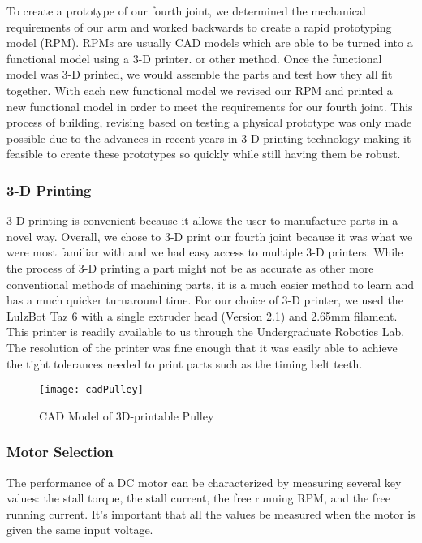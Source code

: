 \noindent To create a prototype of our fourth joint, we determined the mechanical requirements of our arm and worked backwards to create a rapid prototyping model (RPM).  RPMs are usually CAD models which are able to be turned into a functional model using a 3-D printer. or other method.  Once the functional model was 3-D printed, we would assemble the parts and test how they all fit together.  With each new functional model we revised our RPM and printed a new functional model in order to meet the requirements for our fourth joint. This process of building, revising based on testing a physical prototype was only made possible due to the advances in recent years in 3-D printing technology making it feasible to create these prototypes so quickly while still having them be robust. 


\subsubsection{3-D Printing}
3-D printing is convenient because it allows the user to manufacture parts in a novel way. Overall, we chose to 3-D print our fourth joint because it was what we were most familiar with and we had easy access to multiple 3-D printers.  While the process of 3-D printing a part might not be as accurate as other more conventional methods of machining parts, it is a much easier method to learn and has a much quicker turnaround time. For our choice of 3-D printer, we used the LulzBot Taz 6 \cite{Taz6} with a single extruder head (Version 2.1) and 2.65mm filament. This printer is readily available to us through the Undergraduate Robotics Lab. The resolution of the printer was fine enough that it was easily able to achieve the tight tolerances needed to print parts such as the timing belt teeth.  

\begin{figure}[H]
	\centering
	\texttt{[image: cadPulley]}
	\caption{CAD Model of 3D-printable Pulley}
	\label{CAD Model of 3D-printable Pulley}
\end{figure}

\subsubsection{Motor Selection}

The performance of a DC motor can be characterized by measuring several key values: the stall torque, the stall current, the free running RPM, and the free running current. It's important that all the values be measured when the motor is given the same input voltage.\\

